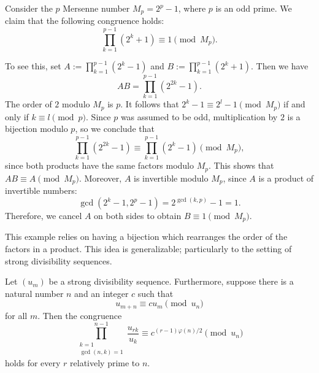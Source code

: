 \begin{example}
  Consider the $p$\supth{} Mersenne number $M_p=2^p-1$, where $p$ is an odd prime. We claim that the following congruence holds:
  \begin{equation*}
    \prod_{k=1}^{p-1}(2^k+1)\equiv 1\pmod{M_p}.
  \end{equation*}

  To see this, set $A:=\prod_{k=1}^{p-1}(2^k-1)$ and $B:=\prod_{k=1}^{p-1}(2^k+1)$. Then we have
  \begin{equation*}
    AB=\prod_{k=1}^{p-1}(2^{2k}-1).
  \end{equation*}
  The order of $2$ modulo $M_p$ is $p$. It follows that $2^k-1\equiv 2^l-1\pmod{M_p}$ if and only if $k\equiv l\pmod{p}$. Since $p$ was assumed to be odd, multiplication by $2$ is a bijection modulo $p$, so we conclude that
  \begin{equation*}
    \prod_{k=1}^{p-1}(2^{2k}-1)\equiv \prod_{k=1}^{p-1}(2^k-1) \pmod{M_p},
  \end{equation*}
  since both products have the same factors modulo $M_p$. This shows that $AB\equiv A\pmod{M_p}$.
  Moreover, $A$ is invertible modulo $M_p$, since $A$ is a product of invertible numbers:
  \begin{equation*}
    \gcd(2^k-1,2^p-1)=2^{\gcd(k,p)}-1=1.
  \end{equation*}
  Therefore, we cancel $A$ on both sides to obtain $B\equiv 1\pmod{M_p}$.

  This example relies on having a bijection which rearranges the order of the factors in a product. This idea is generalizable; particularly to the setting of strong divisibility sequences.
\end{example}

\begin{theorem}\label{theorem:product-congruence-SDS}
  Let $(u_m)$ be a strong divisibility sequence. Furthermore, suppose there is a natural number $n$ and an integer $c$ such that
  \begin{equation*}
    u_{m+n}\equiv cu_m\pmod{u_n}
  \end{equation*}
  for all $m$. Then the congruence
  \begin{equation*}
    \prod_{\substack{k=1\\\gcd(n,k)=1}}^{n-1}\frac{u_{rk}}{u_k}\equiv c^{(r-1)\varphi(n)/2} \pmod{u_n}
  \end{equation*}
  holds for every $r$ relatively prime to $n$.
\end{theorem}

